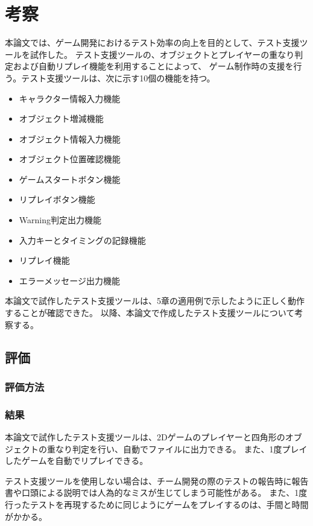 \chapter{考察}\label{cha:Discussion}
本論文では、ゲーム開発におけるテスト効率の向上を目的として、テスト支援ツールを試作した。
テスト支援ツールの、オブジェクトとプレイヤーの重なり判定および自動リプレイ機能を利用することによって、
ゲーム制作時の支援を行う。テスト支援ツールは、次に示す10個の機能を持つ。

\begin{itemize}
	\item キャラクター情報入力機能
	\item オブジェクト増減機能
	\item オブジェクト情報入力機能
	\item オブジェクト位置確認機能
	\item ゲームスタートボタン機能
	\item リプレイボタン機能
	\item Warning判定出力機能
	\item 入力キーとタイミングの記録機能
	\item リプレイ機能
	\item エラーメッセージ出力機能
\end{itemize}

本論文で試作したテスト支援ツールは、5章の適用例で示したように正しく動作することが確認できた。
以降、本論文で作成したテスト支援ツールについて考察する。

\section{評価}

\subsection{評価方法}
\subsection{結果}
本論文で試作したテスト支援ツールは、2Dゲームのプレイヤーと四角形のオブジェクトの重なり判定を行い、自動でファイルに出力できる。
また、1度プレイしたゲームを自動でリプレイできる。

テスト支援ツールを使用しない場合は、チーム開発の際のテストの報告時に報告書や口頭による説明では人為的なミスが生じてしまう可能性がある。
また、1度行ったテストを再現するために同じようにゲームをプレイするのは、手間と時間がかかる。

